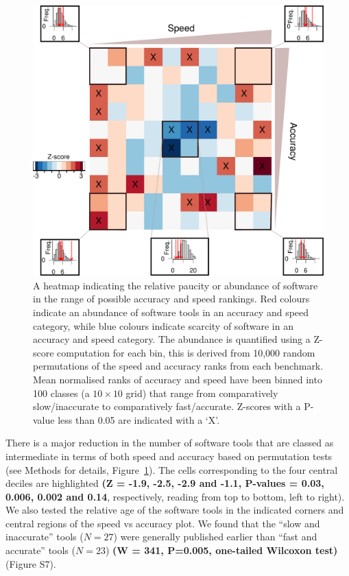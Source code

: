 \documentclass[fleqn,10pt]{SelfArx} %
\begin{document}
\begin{figure}
\includegraphics[width=\textwidth]{figure2.pdf}
\caption{A heatmap indicating the relative paucity or abundance of
  software in the range of possible accuracy and speed rankings. Red
  colours indicate an abundance of software tools in an accuracy and
  speed category, while blue colours indicate scarcity of software in
  an accuracy and speed category. The abundance is quantified using a
  Z-score computation for each bin, this is derived from 10,000 random
  permutations of the speed and accuracy ranks from each
  benchmark. Mean normalised ranks of accuracy and speed have been
  binned into 100 classes (a $10\times10$ grid) that range from
  comparatively slow/inaccurate to comparatively
  fast/accurate. Z-scores with a P-value less than 0.05 are indicated
  with a ‘X’.}
\label{fig:speedaccuracy}
\end{figure}

There is a major reduction in the number of software tools that are
classed as intermediate in terms of both speed and accuracy based on
permutation tests (see Methods for details, Figure~\ref{fig:speedaccuracy}). The cells
corresponding to the four central deciles are
highlighted \textbf{{\color{red}(Z = -1.9, -2.5, -2.9 and -1.1, P-values = 0.03, 0.006,
0.002 and 0.14}}, respectively, reading from top to bottom, left to
right). We also tested the relative age of the software tools in
the indicated corners and central regions of the speed vs
accuracy plot. We found that the “slow and inaccurate” tools ($N=27$) were
generally published earlier than ``fast and accurate'' tools ($N=23$) \textbf{{\color{red}(W = 341, P=0.005,
one-tailed Wilcoxon test)}} (Figure S7).
\end{document}
